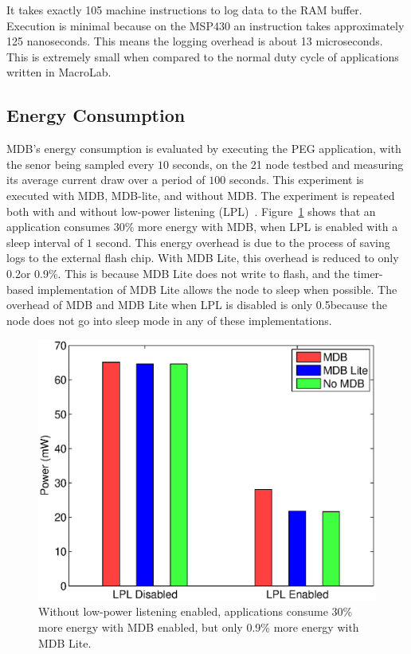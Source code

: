It takes exactly 105 machine instructions to log data to the RAM buffer.
Execution is minimal because on the MSP430 an instruction takes approximately
125 nanoseconds.  This means the logging overhead is about 13 microseconds.
This is extremely small when compared to the normal duty cycle of applications
written in MacroLab.

\subsection{Energy Consumption} \label{PowerConsumption}

MDB's energy consumption is evaluated by executing the PEG application, with the
senor being sampled every $10$ seconds, on the 21 node testbed and measuring its
average current draw over a period of $100$ seconds. This experiment is executed
with MDB, MDB-lite, and without MDB\@.  The experiment is repeated both with and
without low-power listening
(LPL)~\cite{Polastrea}. Figure~\ref{fig:mdbPowerConsumption} shows that an
application consumes 30\% more energy with MDB, when LPL is enabled with a sleep
interval of $1$ second.  This energy overhead is due to the process of saving
logs to the external flash chip. With MDB Lite, this overhead is reduced to only
0.2\mW or 0.9\%.  This is because MDB Lite does not write to flash, and the
timer-based implementation of MDB Lite allows the node to sleep when possible.
The overhead of MDB and MDB Lite when LPL is disabled is only 0.5\mW because the
node does not go into sleep mode in any of these implementations.

\begin{figure}[t]
  \centering \includegraphics[width=0.6\columnwidth]{fig/energy}
  \caption[Energy Consumption]{Without low-power listening enabled, applications
  consume 30\% more energy with MDB enabled, but only 0.9\% more energy with MDB
  Lite. }
    \label{fig:mdbPowerConsumption}
\end{figure}

